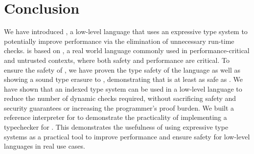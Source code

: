 \chapter{Conclusion}
\label{chp:conclusion}
We have introduced \name, a low-level language that uses an expressive type system to potentially improve performance via the elimination of unnecessary run-time checks.
\name is based on \wasm, a real world language commonly used in performance-critical and untrusted contexts, where both safety and performance are critical.
To ensure the safety of \name, we have proven the type safety of the \name language as well as showing a sound type erasure to \wasm, demonstrating that \name is at least as safe as \wasm.
We have shown that an indexed type system can be used in a low-level language to reduce the number of dynamic checks required, without sacrificing safety and security guarantees or increasing the programmer's proof burden.
We built a reference interpreter for \name to demonstrate the practicality of implementing a typechecker for \name.
This demonstrates the usefulness of using expressive type systems as a practical tool to improve performance and ensure safety for low-level languages in real use cases.
